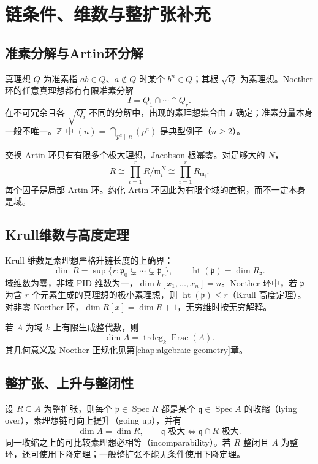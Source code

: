 \documentclass[../main.tex]{subfiles}
\begin{document}
\section{链条件、维数与整扩张补充}
\subsection{准素分解与Artin环分解}
真理想 $Q$ 为准素指 $ab\in Q$、$a\notin Q$ 时某个 $b^n\in Q$；其根 $\sqrt Q$ 为素理想。Noether 环的任意真理想都有有限准素分解
\[
I=Q_1\cap\cdots\cap Q_r.
\]
在不可冗余且各 $\sqrt{Q_i}$ 不同的分解中，出现的素理想集合由 $I$ 确定；准素分量本身一般不唯一。$\mathbb Z$ 中 $(n)=\bigcap_{p^a\parallel n}(p^a)$ 是典型例子（$n\ge2$）。

交换 Artin 环只有有限多个极大理想，Jacobson 根幂零。对足够大的 $N$，
\[
R\cong\prod_{i=1}^rR/\mathfrak m_i^N\cong\prod_{i=1}^rR_{\mathfrak m_i}.
\]
每个因子是局部 Artin 环。约化 Artin 环因此为有限个域的直积，而不一定本身是域。

\subsection{Krull维数与高度定理}
Krull 维数是素理想严格升链长度的上确界：
\[
\dim R=\sup\{r:\mathfrak p_0\subsetneq\cdots\subsetneq\mathfrak p_r\},\qquad
\operatorname{ht}(\mathfrak p)=\dim R_{\mathfrak p}.
\]
域维数为零，非域 PID 维数为一，$\dim k[x_1,\ldots,x_n]=n$。Noether 环中，若 $\mathfrak p$ 为含 $r$ 个元素生成的真理想的极小素理想，则 $\operatorname{ht}(\mathfrak p)\le r$（Krull 高度定理）。对非零 Noether 环，$\dim R[x]=\dim R+1$，无穷维时按无穷解释。

若 $A$ 为域 $k$ 上有限生成整代数，则
\[
\dim A=\operatorname{trdeg}_k\operatorname{Frac}(A).
\]
其几何意义及 Noether 正规化见第\ref{chap:algebraic-geometry}章。

\subsection{整扩张、上升与整闭性}
设 $R\subseteq A$ 为整扩张，则每个 $\mathfrak p\in\operatorname{Spec}R$ 都是某个 $\mathfrak q\in\operatorname{Spec}A$ 的收缩（lying over），素理想链可向上提升（going up），并有
\[
\dim A=\dim R,\qquad
\mathfrak q\text{ 极大}\iff\mathfrak q\cap R\text{ 极大}.
\]
同一收缩之上的可比较素理想必相等（incomparability）。若 $R$ 整闭且 $A$ 为整环，还可使用下降定理；一般整扩张不能无条件使用下降定理。
\end{document}
